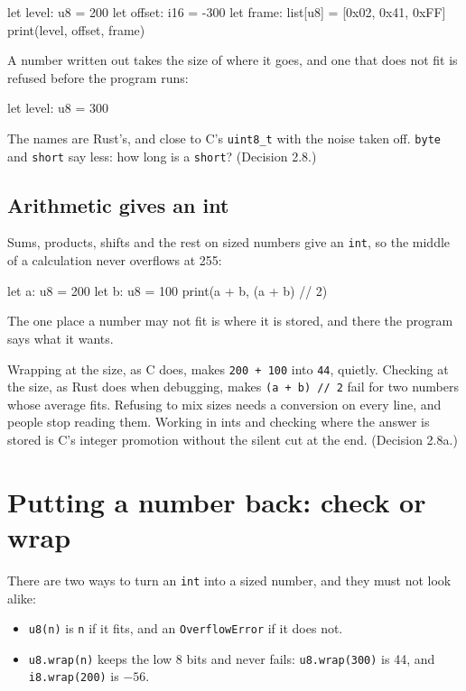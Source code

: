 \begin{zeno}
let level: u8 = 200
let offset: i16 = -300
let frame: list[u8] = [0x02, 0x41, 0xFF]
print(level, offset, frame)
\end{zeno}

A number written out takes the size of where it goes, and one that
does not fit is refused before the program runs:

\begin{zeno}[fails=yes]
let level: u8 = 300
\end{zeno}

\begin{why}
The names are Rust's, and close to C's \verb|uint8_t| with the noise
taken off. \verb|byte| and \verb|short| say less: how long is a
\verb|short|? (Decision 2.8.)
\end{why}

\subsection{Arithmetic gives an int}

Sums, products, shifts and the rest on sized numbers give an
\verb|int|, so the middle of a calculation never overflows at 255:

\begin{zeno}
let a: u8 = 200
let b: u8 = 100
print(a + b, (a + b) // 2)
\end{zeno}

The one place a number may not fit is where it is stored, and there
the program says what it wants.

\begin{why}
Wrapping at the size, as C does, makes \verb|200 + 100| into
\verb|44|, quietly. Checking at the size, as Rust does when debugging,
makes \verb|(a + b) // 2| fail for two numbers whose average fits.
Refusing to mix sizes needs a conversion on every line, and people
stop reading them. Working in ints and checking where the answer is
stored is C's integer promotion without the silent cut at the end.
(Decision 2.8a.)
\end{why}

\section{Putting a number back: check or wrap}

There are two ways to turn an \verb|int| into a sized number, and they
must not look alike:

\begin{itemize}
\item \verb|u8(n)| is \verb|n| if it fits, and an
  \verb|OverflowError| if it does not.
\item \verb|u8.wrap(n)| keeps the low 8 bits and never fails:
  \verb|u8.wrap(300)| is 44, and \verb|i8.wrap(200)| is $-56$.
\end{itemize}

